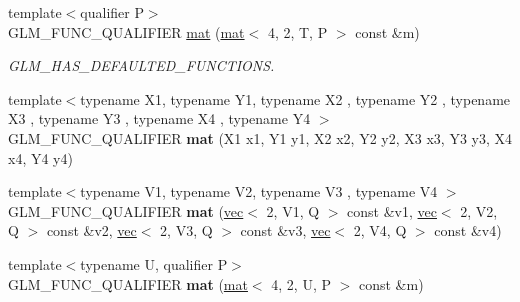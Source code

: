 \begin{DoxyCompactItemize}
\item 
\mbox{\label{structglm_1_1mat_3_014_00_012_00_01T_00_01Q_01_4_a0771eeac4e4c4171d2eb1dbf614acf6d}} 
{\footnotesize template$<$qualifier P$>$ }\\G\+L\+M\+\_\+\+F\+U\+N\+C\+\_\+\+Q\+U\+A\+L\+I\+F\+I\+ER \hyperlink{structglm_1_1mat_3_014_00_012_00_01T_00_01Q_01_4_a0771eeac4e4c4171d2eb1dbf614acf6d}{mat} (\hyperlink{structglm_1_1mat}{mat}$<$ 4, 2, T, P $>$ const \&m)
\begin{DoxyCompactList}\small\item\em G\+L\+M\+\_\+\+H\+A\+S\+\_\+\+D\+E\+F\+A\+U\+L\+T\+E\+D\+\_\+\+F\+U\+N\+C\+T\+I\+O\+NS. \end{DoxyCompactList}\item 
\mbox{\label{structglm_1_1mat_3_014_00_012_00_01T_00_01Q_01_4_ab3e35b3a0ebccd177129fc05af41277b}} 
{\footnotesize template$<$typename X1, typename Y1, typename X2 , typename Y2 , typename X3 , typename Y3 , typename X4 , typename Y4 $>$ }\\G\+L\+M\+\_\+\+F\+U\+N\+C\+\_\+\+Q\+U\+A\+L\+I\+F\+I\+ER {\bfseries mat} (X1 x1, Y1 y1, X2 x2, Y2 y2, X3 x3, Y3 y3, X4 x4, Y4 y4)
\item 
\mbox{\label{structglm_1_1mat_3_014_00_012_00_01T_00_01Q_01_4_aa3231dc5acd32525344b25b9d4c0697d}} 
{\footnotesize template$<$typename V1, typename V2, typename V3 , typename V4 $>$ }\\G\+L\+M\+\_\+\+F\+U\+N\+C\+\_\+\+Q\+U\+A\+L\+I\+F\+I\+ER {\bfseries mat} (\hyperlink{structglm_1_1vec}{vec}$<$ 2, V1, Q $>$ const \&v1, \hyperlink{structglm_1_1vec}{vec}$<$ 2, V2, Q $>$ const \&v2, \hyperlink{structglm_1_1vec}{vec}$<$ 2, V3, Q $>$ const \&v3, \hyperlink{structglm_1_1vec}{vec}$<$ 2, V4, Q $>$ const \&v4)
\item 
\mbox{\label{structglm_1_1mat_3_014_00_012_00_01T_00_01Q_01_4_a1def800c247952c12c5f088868de7935}} 
{\footnotesize template$<$typename U, qualifier P$>$ }\\G\+L\+M\+\_\+\+F\+U\+N\+C\+\_\+\+Q\+U\+A\+L\+I\+F\+I\+ER {\bfseries mat} (\hyperlink{structglm_1_1mat}{mat}$<$ 4, 2, U, P $>$ const \&m)
\item 
\mbox{\label{structglm_1_1mat_3_014_00_012_00_01T_00_01Q_01_4_a356eb3112895d93e5689f5f489bc0c94}} 

\end{DoxyCompactItemize}
